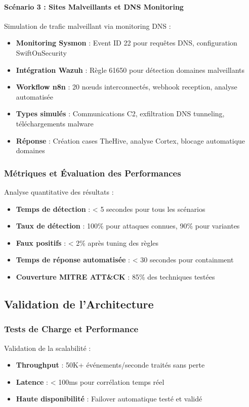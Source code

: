 \paragraph{Scénario 3 : Sites Malveillants et DNS Monitoring}
Simulation de trafic malveillant via monitoring DNS :
\begin{itemize}
    \item \textbf{Monitoring Sysmon} : Event ID 22 pour requêtes DNS, configuration SwiftOnSecurity
    \item \textbf{Intégration Wazuh} : Règle 61650 pour détection domaines malveillants
    \item \textbf{Workflow n8n} : 20 nœuds interconnectés, webhook reception, analyse automatisée
    \item \textbf{Types simulés} : Communications C2, exfiltration DNS tunneling, téléchargements malware
    \item \textbf{Réponse} : Création cases TheHive, analyse Cortex, blocage automatique domaines
\end{itemize}

\subsubsection{Métriques et Évaluation des Performances}
Analyse quantitative des résultats :
\begin{itemize}
    \item \textbf{Temps de détection} : < 5 secondes pour tous les scénarios
    \item \textbf{Taux de détection} : 100\% pour attaques connues, 90\% pour variantes
    \item \textbf{Faux positifs} : < 2\% après tuning des règles
    \item \textbf{Temps de réponse automatisée} : < 30 secondes pour containment
    \item \textbf{Couverture MITRE ATT\&CK} : 85\% des techniques testées
\end{itemize}

\subsection{Validation de l'Architecture}

\subsubsection{Tests de Charge et Performance}
Validation de la scalabilité :
\begin{itemize}
    \item \textbf{Throughput} : 50K+ événements/seconde traités sans perte
    \item \textbf{Latence} : < 100ms pour corrélation temps réel
    \item \textbf{Haute disponibilité} : Failover automatique testé et validé
\end{itemize}

